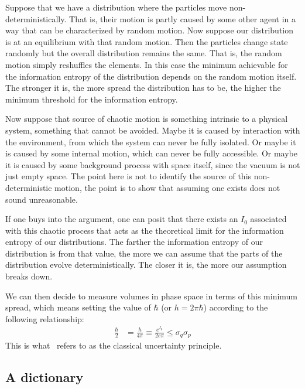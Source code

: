 \documentclass[11pt]{elsarticle}
\begin{document}
Suppose that we have a distribution where the particles move non-deterministically. That is, their motion is partly caused by some other agent in a way that can be characterized by random motion. Now suppose our distribution is at an equilibrium with that random motion. Then the particles change state randomly but the overall distribution remains the same. That is, the random motion simply reshuffles the elements. In this case the minimum achievable for the information entropy of the distribution depends on the random motion itself. The stronger it is, the more spread the distribution has to be, the higher the minimum threshold for the information entropy.

Now suppose that source of chaotic motion is something intrinsic to a physical system, something that cannot be avoided. Maybe it is caused by interaction with the environment, from which the system can never be fully isolated. Or maybe it is caused by some internal motion, which can never be fully accessible. Or maybe it is caused by some background process with space itself, since the vacuum is not just empty space. The point here is not to identify the source of this non-deterministic motion, the point is to show that assuming one exists does not sound unreasonable.

If one buys into the argument, one can posit that there exists an $I_0$ associated with this chaotic process that acts as the theoretical limit for the information entropy of our distributions. The farther the information entropy of our distribution is from that value, the more we can assume that the parts of the distribution evolve deterministically. The closer it is, the more our assumption breaks down.

We can then decide to measure volumes in phase space in terms of this minimum spread, which means setting the value of $\hbar$ (or $h = 2 \pi \hbar$) according to the following relationship:
\begin{align*}
\frac{\hbar}{2} &= \frac{h}{4\pi} \equiv  \frac{e^{I_0}}{2 e \pi} \leq \sigma_q\sigma_p
\end{align*}
 This is what~\cite{AoPPhy1} refers to as the classical uncertainty principle.

\subsection*{A dictionary}
\end{document}
